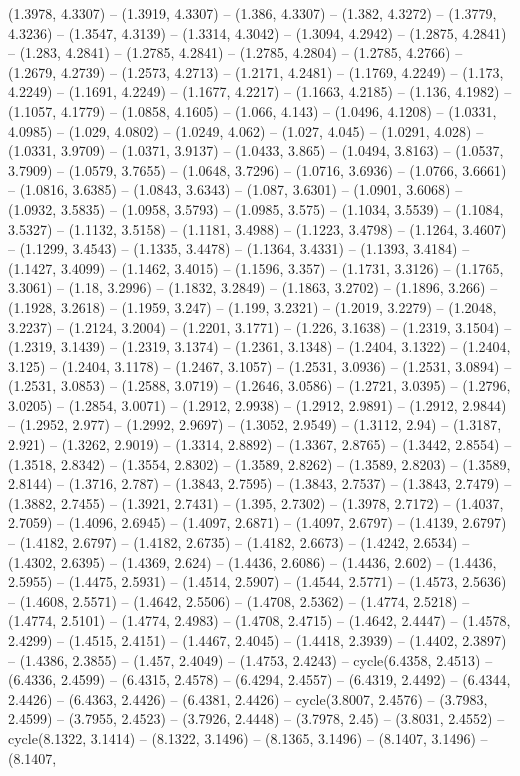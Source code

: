 (1.3978, 4.3307) -- (1.3919, 4.3307) -- (1.386, 4.3307) -- (1.382, 4.3272) -- (1.3779, 4.3236) -- (1.3547, 4.3139) -- (1.3314, 4.3042) -- (1.3094, 4.2942) -- (1.2875, 4.2841) -- (1.283, 4.2841) -- (1.2785, 4.2841) -- (1.2785, 4.2804) -- (1.2785, 4.2766) -- (1.2679, 4.2739) -- (1.2573, 4.2713) -- (1.2171, 4.2481) -- (1.1769, 4.2249) -- (1.173, 4.2249) -- (1.1691, 4.2249) -- (1.1677, 4.2217) -- (1.1663, 4.2185) -- (1.136, 4.1982) -- (1.1057, 4.1779) -- (1.0858, 4.1605) -- (1.066, 4.143) -- (1.0496, 4.1208) -- (1.0331, 4.0985) -- (1.029, 4.0802) -- (1.0249, 4.062) -- (1.027, 4.045) -- (1.0291, 4.028) -- (1.0331, 3.9709) -- (1.0371, 3.9137) -- (1.0433, 3.865) -- (1.0494, 3.8163) -- (1.0537, 3.7909) -- (1.0579, 3.7655) -- (1.0648, 3.7296) -- (1.0716, 3.6936) -- (1.0766, 3.6661) -- (1.0816, 3.6385) -- (1.0843, 3.6343) -- (1.087, 3.6301) -- (1.0901, 3.6068) -- (1.0932, 3.5835) -- (1.0958, 3.5793) -- (1.0985, 3.575) -- (1.1034, 3.5539) -- (1.1084, 3.5327) -- (1.1132, 3.5158) -- (1.1181, 3.4988) -- (1.1223, 3.4798) -- (1.1264, 3.4607) -- (1.1299, 3.4543) -- (1.1335, 3.4478) -- (1.1364, 3.4331) -- (1.1393, 3.4184) -- (1.1427, 3.4099) -- (1.1462, 3.4015) -- (1.1596, 3.357) -- (1.1731, 3.3126) -- (1.1765, 3.3061) -- (1.18, 3.2996) -- (1.1832, 3.2849) -- (1.1863, 3.2702) -- (1.1896, 3.266) -- (1.1928, 3.2618) -- (1.1959, 3.247) -- (1.199, 3.2321) -- (1.2019, 3.2279) -- (1.2048, 3.2237) -- (1.2124, 3.2004) -- (1.2201, 3.1771) -- (1.226, 3.1638) -- (1.2319, 3.1504) -- (1.2319, 3.1439) -- (1.2319, 3.1374) -- (1.2361, 3.1348) -- (1.2404, 3.1322) -- (1.2404, 3.125) -- (1.2404, 3.1178) -- (1.2467, 3.1057) -- (1.2531, 3.0936) -- (1.2531, 3.0894) -- (1.2531, 3.0853) -- (1.2588, 3.0719) -- (1.2646, 3.0586) -- (1.2721, 3.0395) -- (1.2796, 3.0205) -- (1.2854, 3.0071) -- (1.2912, 2.9938) -- (1.2912, 2.9891) -- (1.2912, 2.9844) -- (1.2952, 2.977) -- (1.2992, 2.9697) -- (1.3052, 2.9549) -- (1.3112, 2.94) -- (1.3187, 2.921) -- (1.3262, 2.9019) -- (1.3314, 2.8892) -- (1.3367, 2.8765) -- (1.3442, 2.8554) -- (1.3518, 2.8342) -- (1.3554, 2.8302) -- (1.3589, 2.8262) -- (1.3589, 2.8203) -- (1.3589, 2.8144) -- (1.3716, 2.787) -- (1.3843, 2.7595) -- (1.3843, 2.7537) -- (1.3843, 2.7479) -- (1.3882, 2.7455) -- (1.3921, 2.7431) -- (1.395, 2.7302) -- (1.3978, 2.7172) -- (1.4037, 2.7059) -- (1.4096, 2.6945) -- (1.4097, 2.6871) -- (1.4097, 2.6797) -- (1.4139, 2.6797) -- (1.4182, 2.6797) -- (1.4182, 2.6735) -- (1.4182, 2.6673) -- (1.4242, 2.6534) -- (1.4302, 2.6395) -- (1.4369, 2.624) -- (1.4436, 2.6086) -- (1.4436, 2.602) -- (1.4436, 2.5955) -- (1.4475, 2.5931) -- (1.4514, 2.5907) -- (1.4544, 2.5771) -- (1.4573, 2.5636) -- (1.4608, 2.5571) -- (1.4642, 2.5506) -- (1.4708, 2.5362) -- (1.4774, 2.5218) -- (1.4774, 2.5101) -- (1.4774, 2.4983) -- (1.4708, 2.4715) -- (1.4642, 2.4447) -- (1.4578, 2.4299) -- (1.4515, 2.4151) -- (1.4467, 2.4045) -- (1.4418, 2.3939) -- (1.4402, 2.3897) -- (1.4386, 2.3855) -- (1.457, 2.4049) -- (1.4753, 2.4243) -- cycle(6.4358, 2.4513) -- (6.4336, 2.4599) -- (6.4315, 2.4578) -- (6.4294, 2.4557) -- (6.4319, 2.4492) -- (6.4344, 2.4426) -- (6.4363, 2.4426) -- (6.4381, 2.4426) -- cycle(3.8007, 2.4576) -- (3.7983, 2.4599) -- (3.7955, 2.4523) -- (3.7926, 2.4448) -- (3.7978, 2.45) -- (3.8031, 2.4552) -- cycle(8.1322, 3.1414) -- (8.1322, 3.1496) -- (8.1365, 3.1496) -- (8.1407, 3.1496) -- (8.1407, 